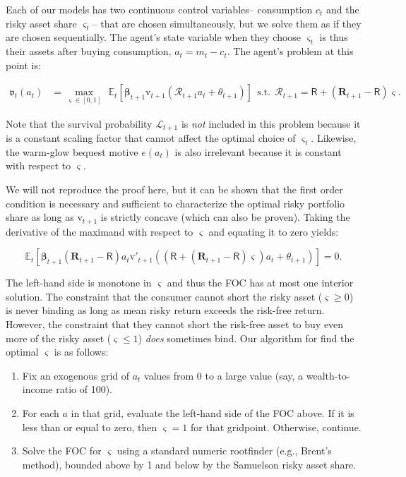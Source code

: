 \documentclass{article}
\newcommand{\Rport}{\mathcal{R}}
\newcommand{\vFunc}{\mathrm{v}}
\newcommand{\Alive}{\mathcal{L}}
\newcommand{\Ex}{\mathbb{E}}
\newcommand{\cNrm}{c}
\newcommand{\mNrm}{m}
\newcommand{\aNrm}{a}
\newcommand{\Rfree}{\mathsf{R}}
\newcommand{\Risky}{\mathbf{R}}
\begin{document}
Each of our models has two continuous control variables-- consumption $\cNrm_t$ and the risky asset share $\varsigma_t$-- that are chosen simultaneously, but we solve them as if they are chosen sequentially. The agent's state variable when they choose $\varsigma_t$ is thus their assets after buying consumption, $\aNrm_t = \mNrm_t - \cNrm_t$. The agent's problem at this point is:

\begin{align}
\mathfrak{v}_{t}(\aNrm_t) & = \max_{\varsigma \in [0,1]}~~ \Ex_{t}\left[ \pmb{\beta}_{t+1} \vFunc_{t+1}(\Rport_{t+1} \aNrm_t + \theta_{t+1}) \right] ~~ \text{s.t.} ~~ \Rport_{t+1} = \Rfree + (\Risky_{t+1 }-\Rfree)\varsigma.
\end{align}

Note that the survival probability $\Alive_{t+1}$ is \textit{not} included in this problem because it is a constant scaling factor that cannot affect the optimal choice of $\varsigma_t$. Likewise, the warm-glow bequest motive $e(\aNrm_t)$ is also irrelevant because it is constant with respect to $\varsigma$.

We will not reproduce the proof here, but it can be shown that the first order condition is necessary and sufficient to characterize the optimal risky portfolio share as long as $\vFunc_{t+1}$ is strictly concave (which can also be proven). Taking the derivative of the maximand with respect to $\varsigma$ and equating it to zero yields:

\begin{equation}
\label{eq:foc-share}
\Ex_{t}\left[ \pmb{\beta}_{t+1} (\Risky_{t+1}-\Rfree) \aNrm_t \vFunc'_{t+1}((\Rfree + (\Risky_{t+1}-\Rfree)\varsigma) \aNrm_t + \theta_{t+1}) \right] = 0.
\end{equation}

The left-hand side is monotone in $\varsigma$ and thus the FOC has at most one interior solution. The constraint that the consumer cannot short the risky asset ($\varsigma \geq 0$) is never binding as long as mean risky return exceeds the risk-free return. However, the constraint that they cannot short the risk-free asset to buy even more of the risky asset ($\varsigma \leq 1$) \textit{does} sometimes bind. Our algorithm for find the optimal $\varsigma$ is as follows:

\begin{enumerate}
\item Fix an exogenous grid of $\aNrm_t$ values from 0 to a large value (say, a wealth-to-income ratio of 100).


\item For each $\aNrm$ in that grid, evaluate the left-hand side of the FOC above. If it is less than or equal to zero, then $\varsigma = 1$ for that gridpoint. Otherwise, continue.


\item Solve the FOC for $\varsigma$ using a standard numeric rootfinder (e.g., Brent's method), bounded above by 1 and below by the Samuelson risky asset share.
\end{enumerate}
\end{document}
